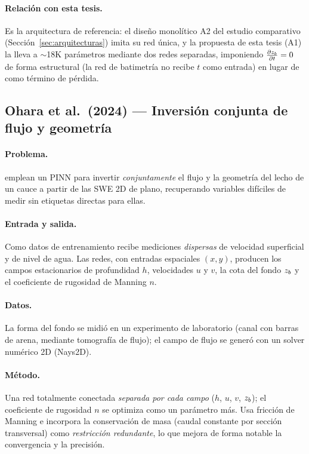 \paragraph{Relación con esta tesis.}
Es la arquitectura de referencia: el diseño monolítico A2 del estudio
comparativo (Sección~\ref{sec:arquitecturas}) imita su red única, y la propuesta
de esta tesis (A1) la lleva a $\sim$18K parámetros mediante dos redes separadas,
imponiendo $\frac{\partial z_b}{\partial t}=0$ de forma estructural (la red de batimetría no recibe
$t$ como entrada) en lugar de como término de pérdida.

\subsection{Ohara et al.\ (2024) --- Inversión conjunta de flujo y geometría}
\label{sec:lit:ohara}

\paragraph{Problema.}
\cite{ohara2024} emplean un PINN para invertir \emph{conjuntamente} el flujo y
la geometría del lecho de un cauce a partir de las SWE 2D de plano, recuperando
variables difíciles de medir sin etiquetas directas para ellas.

\paragraph{Entrada y salida.}
Como datos de entrenamiento recibe mediciones \emph{dispersas} de velocidad
superficial y de nivel de agua. Las redes, con entradas espaciales $(x,y)$,
producen los campos estacionarios de profundidad $h$, velocidades $u$ y $v$, la
cota del fondo $z_b$ y el coeficiente de rugosidad de Manning $n$.

\paragraph{Datos.}
La forma del fondo se midió en un experimento de laboratorio (canal con barras
de arena, mediante tomografía de flujo); el campo de flujo se generó con un
solver numérico 2D (Nays2D).

\paragraph{Método.}
Una red totalmente conectada \emph{separada por cada campo} ($h$, $u$, $v$,
$z_b$); el coeficiente de rugosidad $n$ se optimiza como un parámetro más. Usa
fricción de Manning e incorpora la conservación de masa (caudal constante por
sección transversal) como \emph{restricción redundante}, lo que mejora de forma
notable la convergencia y la precisión.

